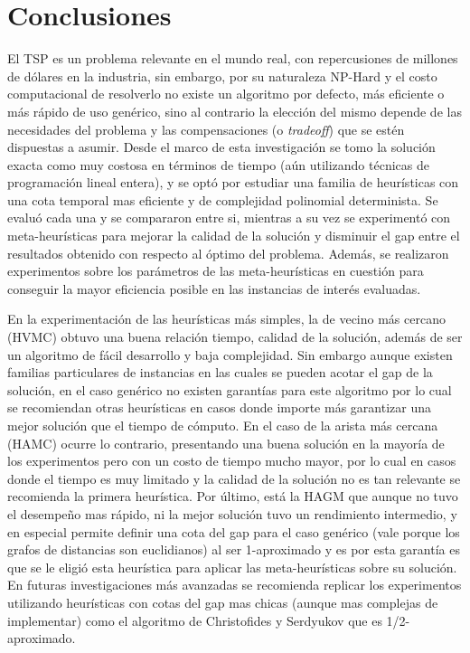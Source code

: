 \documentclass[10pt,a4paper]{article}
\begin{document}
\newpage
\section{Conclusiones}
El TSP es un problema relevante en el mundo real, con repercusiones de millones de dólares en la industria, sin embargo, por su naturaleza NP-Hard y el costo computacional de resolverlo no existe un algoritmo por defecto, más eficiente o más rápido de uso genérico, sino al contrario la elección del mismo depende de las necesidades del problema y las compensaciones (o \emph{tradeoff}) que se estén dispuestas a asumir. Desde el marco de esta investigación se tomo la solución exacta como muy costosa en términos de tiempo (aún utilizando técnicas de programación lineal entera), y se optó por estudiar una familia de heurísticas con una cota temporal mas eficiente y de complejidad polinomial determinista. Se evaluó cada una y se compararon entre si, mientras a su vez se experimentó con meta-heurísticas para mejorar la calidad de la solución y disminuir el gap entre el resultados obtenido con respecto al óptimo del problema. Además, se realizaron experimentos sobre los parámetros de las meta-heurísticas en cuestión para conseguir la mayor eficiencia posible en las instancias de interés evaluadas. %

En la experimentación de las heurísticas más simples, la de vecino más cercano (HVMC) obtuvo una buena relación tiempo, calidad de la solución, además de ser un algoritmo de fácil desarrollo y baja complejidad. Sin embargo aunque existen familias particulares de instancias en las cuales se pueden acotar el gap de la solución, en el caso genérico no existen garantías para este algoritmo por lo cual se recomiendan otras heurísticas en casos donde importe más garantizar una mejor solución que el tiempo de cómputo. 
En el caso de la arista más cercana (HAMC) ocurre lo contrario, presentando una buena solución en la mayoría de los experimentos pero con un costo de tiempo mucho mayor, por lo cual en casos donde el tiempo es muy limitado y la calidad de la solución no es tan relevante se recomienda la primera heurística. Por último, está la HAGM que aunque no tuvo el desempeño mas rápido, ni la mejor solución tuvo un rendimiento intermedio, y en especial permite definir una cota del gap para el caso genérico (vale porque los grafos de distancias son euclidianos) al ser 1-aproximado y es por esta garantía es que se le eligió esta heurística para aplicar las meta-heurísticas sobre su solución. En futuras investigaciones más avanzadas se recomienda replicar los experimentos utilizando heurísticas con cotas del gap mas chicas (aunque mas complejas de implementar) como el algoritmo de Christofides y Serdyukov que es 1/2-aproximado.
\end{document}
